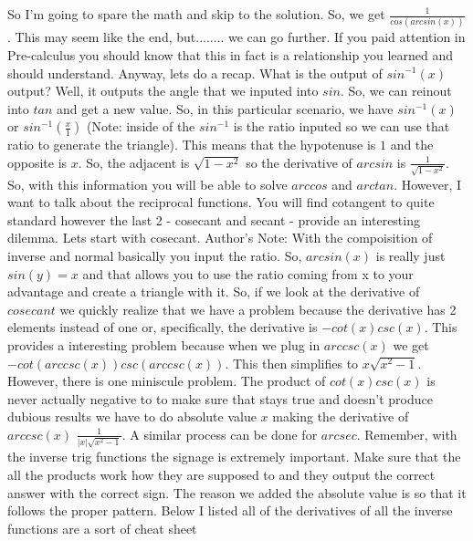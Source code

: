 \documentclass{article}
\begin{document}
So I'm going to spare the math and skip to the solution. So, we get $\frac{1}{cos(arcsin(x))}$. This may seem like the end, but........ we can go further. If you paid attention in Pre-calculus you should know that this in fact is a relationship you learned and should understand. Anyway, lets do a recap. What is the output of $sin^{-1}(x)$ output? Well, it outputs the angle that we inputed into $sin$. So, we can reinout into $tan$ and get a new value. So, in this particular scenario, we have $sin^{-1}(x)$ or $sin^{-1}(\frac{x}{1})$ (Note: inside of the $sin^{-1}$ is the ratio inputed so we can use that ratio to generate the triangle). This means that the hypotenuse is $1$ and the opposite is $x$. So, the adjacent is $\sqrt{1-x^2}$ so the derivative of $arcsin$ is $\frac{1}{\sqrt{1-x^2}}$. So, with this information you will be able to solve $arccos$ and $arctan$. However, I want to talk about the reciprocal functions. You will find cotangent to quite standard however the last 2 - cosecant and secant - provide an interesting dilemma. Lets start with cosecant.
\newline
\newline
Author's Note: With the compoisition of inverse and normal basically you input the ratio. So, $arcsin(x)$ is really just $sin(y) = x$ and that allows you to use the ratio coming from x to your advantage and create a triangle with it.
\newline
\newline
So, if we look at the derivative of $cosecant$ we quickly realize that we have a problem because the  derivative has 2 elements instead of one or, specifically, the derivative is $-cot(x)csc(x)$. This provides a interesting problem because when we plug in $arccsc(x)$ we get $-cot(arccsc(x))csc(arccsc(x))$. This then simplifies to $x\sqrt{x^2-1}$. However, there is one miniscule problem. The product of $cot(x)csc(x)$ is never actually negative to to make sure that stays true and doesn't produce dubious results we have to do absolute value $x$ making the derivative of $arccsc(x)$ $\frac{1}{|x|\sqrt{x^2-1}}$. A similar process can be done for $arcsec$. Remember, with the inverse trig functions the signage is extremely important. Make sure that the all the products work how they are supposed to and they output the correct answer with the correct sign. The reason we added the absolute value is so that it follows the proper pattern.
\newline
\newline
Below I listed all of the derivatives of all the inverse functions are a sort of cheat sheet
\end{document}
